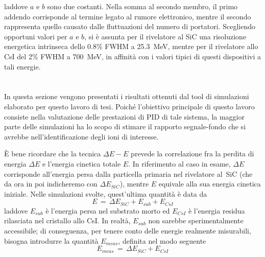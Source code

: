 laddove $a$ e $b$ sono due costanti.
Nella somma al secondo membro, il primo addendo corrisponde al termine legato al rumore elettronico, mentre il secondo rappresenta quello causato dalle fluttuazioni del numero di portatori.
%
%
Scegliendo opportuni valori per $a$ e $b$, si è assunta per il rivelatore al SiC una risoluzione energetica intrinseca dello 0.8\% FWHM a 25.3~MeV, mentre per il rivelatore allo CsI del 2\% FWHM a 700~MeV, in affinità con i valori tipici di questi dispositivi a tali energie. 









\section{}

In questa sezione vengono presentati i risultati ottenuti dal tool di simulazioni elaborato per questo lavoro di tesi.
Poiché l'obiettivo principale di questo lavoro consiste nella valutazione delle prestazioni di PID di tale sistema, la maggior parte delle simulazioni ha lo scopo di stimare il rapporto segnale-fondo che si avrebbe nell'identificazione degli ioni di interesse.

È bene ricordare che la tecnica $\Delta E - E$ prevede la correlazione fra la perdita di energia $\Delta E$ e l'energia cinetica totale $E$. In riferimento al caso in esame, $\Delta E$ corrisponde all'energia persa dalla particella primaria nel rivelatore al~SiC (che da ora in poi indicheremo con $ \Delta E_{SiC}$), mentre $E$ equivale alla sua energia cinetica iniziale. Nelle simulazioni svolte, quest'ultima quantità è data da
\begin{equation}
	E \, = \, \Delta E_{SiC} + E_{sub} + E_{CsI}
\end{equation}
laddove $E_{sub}$ è l'energia persa nel substrato morto ed $E_{CsI}$ è l'energia residua rilasciata nel cristallo allo CsI.
In realtà, $E_{sub}$ non sarebbe sperimentalmente accessibile; di conseguenza, per tenere conto delle energie realmente misurabili, bisogna introdurre la quantità $E_{meas}$, definita nel modo seguente
\begin{equation}
	E_{meas} \, = \, \Delta E_{SiC} + E_{CsI}
\end{equation}

